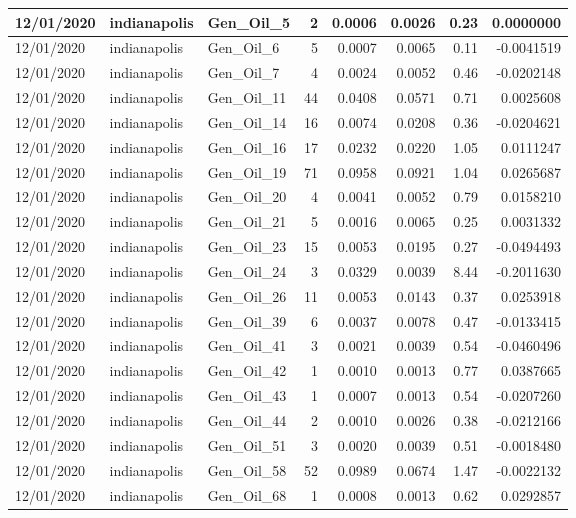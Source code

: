 \documentclass[
  letterpaper,
  DIV=11,
  numbers=noendperiod]{scrartcl}
\begin{document}
\begin{tabular}{l|l|l|r|r|r|r|r}
\hline
12/01/2020 & indianapolis & Gen\_Oil\_5 & 2 & 0.0006 & 0.0026 & 0.23 & 0.0000000\\
\hline
12/01/2020 & indianapolis & Gen\_Oil\_6 & 5 & 0.0007 & 0.0065 & 0.11 & -0.0041519\\
\hline
12/01/2020 & indianapolis & Gen\_Oil\_7 & 4 & 0.0024 & 0.0052 & 0.46 & -0.0202148\\
\hline
12/01/2020 & indianapolis & Gen\_Oil\_11 & 44 & 0.0408 & 0.0571 & 0.71 & 0.0025608\\
\hline
12/01/2020 & indianapolis & Gen\_Oil\_14 & 16 & 0.0074 & 0.0208 & 0.36 & -0.0204621\\
\hline
12/01/2020 & indianapolis & Gen\_Oil\_16 & 17 & 0.0232 & 0.0220 & 1.05 & 0.0111247\\
\hline
12/01/2020 & indianapolis & Gen\_Oil\_19 & 71 & 0.0958 & 0.0921 & 1.04 & 0.0265687\\
\hline
12/01/2020 & indianapolis & Gen\_Oil\_20 & 4 & 0.0041 & 0.0052 & 0.79 & 0.0158210\\
\hline
12/01/2020 & indianapolis & Gen\_Oil\_21 & 5 & 0.0016 & 0.0065 & 0.25 & 0.0031332\\
\hline
12/01/2020 & indianapolis & Gen\_Oil\_23 & 15 & 0.0053 & 0.0195 & 0.27 & -0.0494493\\
\hline
12/01/2020 & indianapolis & Gen\_Oil\_24 & 3 & 0.0329 & 0.0039 & 8.44 & -0.2011630\\
\hline
12/01/2020 & indianapolis & Gen\_Oil\_26 & 11 & 0.0053 & 0.0143 & 0.37 & 0.0253918\\
\hline
12/01/2020 & indianapolis & Gen\_Oil\_39 & 6 & 0.0037 & 0.0078 & 0.47 & -0.0133415\\
\hline
12/01/2020 & indianapolis & Gen\_Oil\_41 & 3 & 0.0021 & 0.0039 & 0.54 & -0.0460496\\
\hline
12/01/2020 & indianapolis & Gen\_Oil\_42 & 1 & 0.0010 & 0.0013 & 0.77 & 0.0387665\\
\hline
12/01/2020 & indianapolis & Gen\_Oil\_43 & 1 & 0.0007 & 0.0013 & 0.54 & -0.0207260\\
\hline
12/01/2020 & indianapolis & Gen\_Oil\_44 & 2 & 0.0010 & 0.0026 & 0.38 & -0.0212166\\
\hline
12/01/2020 & indianapolis & Gen\_Oil\_51 & 3 & 0.0020 & 0.0039 & 0.51 & -0.0018480\\
\hline
12/01/2020 & indianapolis & Gen\_Oil\_58 & 52 & 0.0989 & 0.0674 & 1.47 & -0.0022132\\
\hline
12/01/2020 & indianapolis & Gen\_Oil\_68 & 1 & 0.0008 & 0.0013 & 0.62 & 0.0292857\\

\end{tabular}
\end{document}
